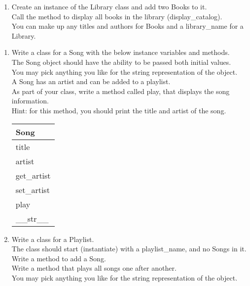 \begin{enumerate}
		\item
			Create an instance of the Library class and add two Books to it.\\
			Call the method to display all books in the library (display\_catalog).\\
			You can make up any titles and authors for Books and a library\_name for a Library.\\
	\end{enumerate}
\pagebreak



	\item
	\begin{enumerate}
		\item
			Write a class for a Song with the below instance variables and methods.\\ 
			The Song object should have the ability to be passed both initial values.\\  
			You may pick anything you like for the string representation of the object.\\
			A Song has an artist and can be added to a playlist.\\  
			As part of your class, write a method called play, that displays the song information.\\
			Hint: for this method, you should print the title and artist of the song.
			\begin{flushright}
			\begin{tabular}{|l|}
				\hline
				Song\\ \hline
				title \\	artist\\	 \hline
				get\_artist \\ set\_artist \\ play \\ \_\_str\_\_ \\ \hline
			\end{tabular}
			\end{flushright}

		\item
			Write a class for a Playlist. \\
			The class should start (instantiate) with a playlist\_name, and no Songs in it. \\ 
			Write a method to add a Song.\\
			Write a method that plays all songs one after another.\\
			You may pick anything you like for the string representation of the object.
	

\end{enumerate}
